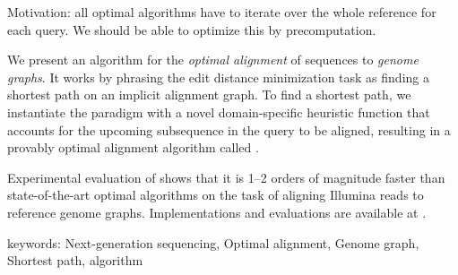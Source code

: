 Motivation: all optimal algorithms have to iterate over the whole reference for
each query. We should be able to optimize this by precomputation.

We present an algorithm for the \emph{optimal alignment} of sequences to
\emph{genome graphs}. It works by phrasing the edit distance minimization
task as finding a shortest path on an implicit alignment graph. To find a
shortest path, we instantiate the \A paradigm with a novel domain-specific
heuristic function that accounts for the upcoming subsequence in the query
to be aligned, resulting in a provably optimal alignment algorithm called
\astarix.

\quad \quad Experimental evaluation of \astarix shows that it is 1--2
orders of magnitude faster than state-of-the-art optimal algorithms on the
task of aligning Illumina reads to reference genome graphs. Implementations
and evaluations are available at \mbox{\astarixurl}.

keywords: Next-generation sequencing, Optimal alignment, Genome graph,
Shortest path, \A algorithm